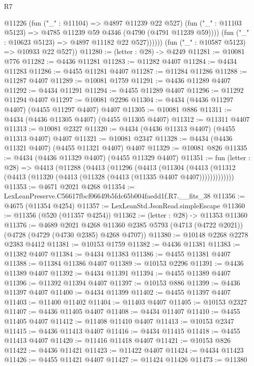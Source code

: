 \begin{lexlean}{R7}
\begin{coremodule}
                @11226
                  (fun ("_" : @11104) => @4897 @11239 @22 @527)
                  (fun ("_" : @11103 @5123) => @4785 @11239 @59 @4346 (@4790 (@4791 @11239 @59))))
                (fun ("_" : @10623 @5123) => @4897 @11182 @22 @527))))))
      (fun ("_" : @10587 @5123) => @10933 @22 @527))
@11280 := (letter : @28) -> @4249
@11281 := @10081 @776
@11282 := @4436 @11281
@11283 := @11282 @4407
@11284 := @4434 @11283
@11286 := @4455 @11281 @4407
@11287 := @11284 @11286
@11288 := @11287 @4407
@11289 := @10081 @1759
@11291 := @4436 @11289 @4407
@11292 := @4434 @11291
@11294 := @4455 @11289 @4407
@11296 := @11292 @11294 @4407
@11297 := @10081 @2296
@11304 := @4434 (@4436 @11297 @4407) (@4455 @11297 @4407) @4407
@11305 := @10081 @886
@11311 := @4434 (@4436 @11305 @4407) (@4455 @11305 @4407)
@11312 := @11311 @4407
@11313 := @10081 @2327
@11320 := @4434 (@4436 @11313 @4407) (@4455 @11313 @4407) @4407
@11321 := @10081 @2347
@11328 := @4434 (@4436 @11321 @4407) (@4455 @11321 @4407) @4407
@11329 := @10081 @826
@11335 := @4434 (@4436 @11329 @4407) (@4455 @11329 @4407)
@11351 := fun (letter : @28) =>
  @4413
    (@11288
      (@4413
        (@11296
          (@4413
            (@11304
              (@4413 (@11312 (@4413 (@11320 (@4413 (@11328 (@4413 (@11335 @4407 @4407)))))))))))))
@11353 := @4671 @2021 @4268
@11354 := LexLeanPreserve.C56617fbcf06649b5fdc65b004faedd1f.R7.__fits_38
@11356 := @4675 (@11354 @4254)
@11357 := LexLeanStd.JsonRead.simpleEscape
@11360 := @11356 (@520 (@11357 @4254))
@11362 := (letter : @28) -> @11353 @11360
@11376 := @4689
    @2021
    @4268
    @11360
    @2385
    @5793
    (@4713 (@4722 @2021))
    (@4728 (@4729 (@4730 @2385) @4268 @4707))
@11380 := @10148 @2268 @2278 @2383 @4412
@11381 := @10153 @1759
@11382 := @4436 @11381
@11383 := @11382 @4407
@11384 := @4434 @11383
@11386 := @4455 @11381 @4407
@11388 := @11384 @11386 @4407
@11389 := @10153 @2296
@11391 := @4436 @11389 @4407
@11392 := @4434 @11391
@11394 := @4455 @11389 @4407
@11396 := @11392 @11394 @4407
@11397 := @10153 @886
@11399 := @4436 @11397 @4407
@11400 := @4434 @11399
@11402 := @4455 @11397 @4407
@11403 := @11400 @11402
@11404 := @11403 @4407
@11405 := @10153 @2327
@11407 := @4436 @11405 @4407
@11408 := @4434 @11407
@11410 := @4455 @11405 @4407
@11412 := @11408 @11410 @4407
@11413 := @10153 @2347
@11415 := @4436 @11413 @4407
@11416 := @4434 @11415
@11418 := @4455 @11413 @4407
@11420 := @11416 @11418 @4407
@11421 := @10153 @826
@11422 := @4436 @11421
@11423 := @11422 @4407
@11424 := @4434 @11423
@11426 := @4455 @11421 @4407
@11427 := @11424 @11426
@11473 := @11380

\end{coremodule}
\end{lexlean}
